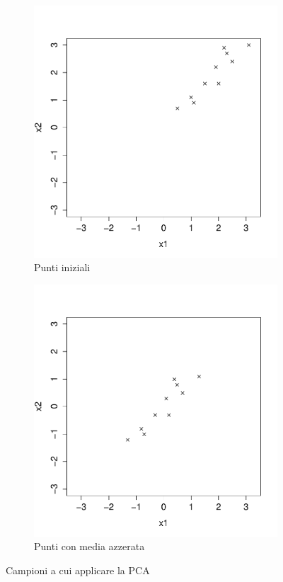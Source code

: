 \begin{figure}
\centering
\begin{subfigure}[b]{0.5\textwidth}
\centering
  \includegraphics[width=\columnwidth]{images/points}
  \caption{Punti iniziali}
  \label{fig:punti_iniziali}
\end{subfigure}%
\begin{subfigure}[b]{0.5\textwidth}
    \centering
  \includegraphics[width=\columnwidth]{images/points_scaled}
  \caption{Punti con media azzerata}
  \label{fig:punti_scalati}
\end{subfigure}
\caption{Campioni a cui applicare la PCA }
\label{fig:PCA}
\end{figure}



